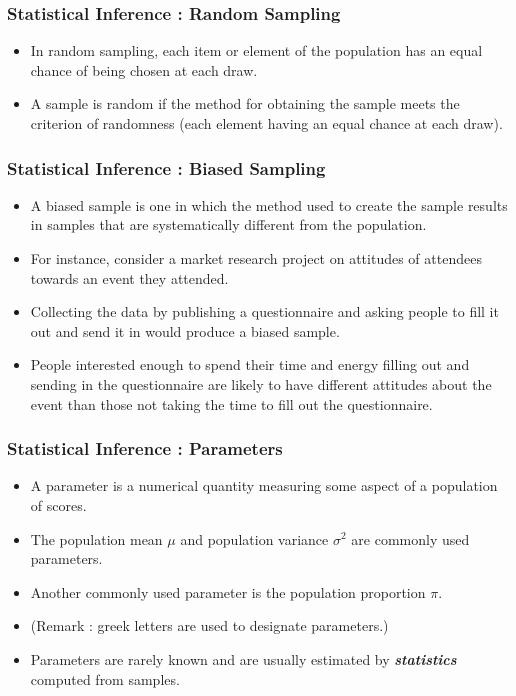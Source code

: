 \begin{frame}
\frametitle{Statistical Inference : Random Sampling}
\begin{itemize}

\item In random sampling, each item or element of the population has an equal chance of being chosen at each draw.
\item A sample is random if the method for obtaining the sample meets the criterion of randomness
(each element having an equal chance at each draw).


\end{itemize}
\end{frame}


\begin{frame}
\frametitle{Statistical Inference : Biased Sampling}
\begin{itemize}


\item A biased sample is one in which the method used to create the sample results
in samples that are systematically different from the population.


\item For instance, consider a market research project on attitudes of attendees towards an event they attended.

\item Collecting the data by publishing a questionnaire and asking people to fill it out and
send it in would produce a biased sample.

\item People interested enough to spend their time and energy filling out and sending in the questionnaire
are likely to have different attitudes about the event than those not taking the time to fill out the questionnaire.

\end{itemize}
\end{frame}





\begin{frame}
\frametitle{Statistical Inference : Parameters}
\begin{itemize}
\item A parameter is a numerical quantity measuring some aspect of a population of scores.
\item The population mean $\mu$ and population variance $\sigma^2$ are commonly used parameters.
\item Another commonly used parameter is the population proportion $\pi$.
\item (Remark : greek letters are used to designate parameters.)
\item Parameters are rarely known and are usually estimated by \textbf{\emph{statistics}} computed from samples.
\end{itemize}
\end{frame}


